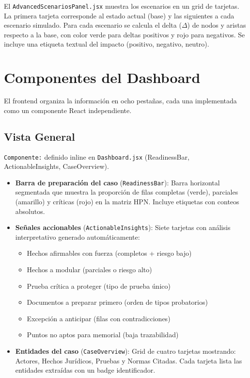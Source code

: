 \documentclass[12pt, letterpaper]{article}
\begin{document}
El \texttt{AdvancedScenariosPanel.jsx} muestra los escenarios en un
grid de tarjetas. La primera tarjeta corresponde al estado actual
(base) y las siguientes a cada escenario simulado. Para cada
escenario se calcula el delta ($\Delta$) de nodos y aristas respecto
a la base, con color verde para deltas positivos y rojo para
negativos. Se incluye una etiqueta textual del impacto (positivo,
negativo, neutro).

\newpage
\section{Componentes del Dashboard}

El frontend organiza la información en ocho pestañas, cada una
implementada como un componente React independiente.

\subsection{Vista General}
\label{sec:vista-general}

\texttt{Componente:} definido inline en \texttt{Dashboard.jsx}
(ReadinessBar, ActionableInsights, CaseOverview).

\begin{itemize}[nosep]
  \item \textbf{Barra de preparación del caso} (\texttt{ReadinessBar}):
    Barra horizontal segmentada que muestra la proporción de filas
    completas (verde), parciales (amarillo) y críticas (rojo) en la
    matriz HPN. Incluye etiquetas con conteos absolutos.

  \item \textbf{Señales accionables} (\texttt{ActionableInsights}):
    Siete tarjetas con análisis interpretativo generado
    automáticamente:
    \begin{itemize}[nosep]
      \item Hechos afirmables con fuerza (completos + riesgo bajo)
      \item Hechos a modular (parciales o riesgo alto)
      \item Prueba crítica a proteger (tipo de prueba único)
      \item Documentos a preparar primero (orden de tipos probatorios)
      \item Excepción a anticipar (filas con contradicciones)
      \item Puntos no aptos para memorial (baja trazabilidad)
    \end{itemize}

  \item \textbf{Entidades del caso} (\texttt{CaseOverview}):
    Grid de cuatro tarjetas mostrando: Actores, Hechos Jurídicos,
    Pruebas y Normas Citadas. Cada tarjeta lista las entidades
    extraídas con un badge identificador.
\end{itemize}
\end{document}
